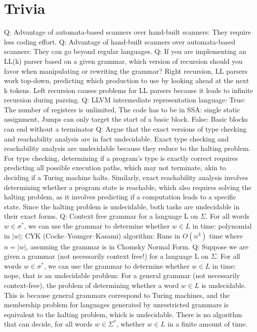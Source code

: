 
\section{Trivia}
Q: Advantage of automata-based scanners over hand-built scanners: They require less coding effort.
Q: Advantage of hand-built scanners over automata-based scanners: They can go beyond regular languages.
Q: If you are implementing an LL(k) parser based on a given grammar, which version of recursion should you favor when manipulating or rewriting the grammar? Right recursion, LL parsers work top-down, predicting which production to use by looking ahead at the next k tokens. Left recursion causes problems for LL parsers because it leads to infinite recursion during parsing.
Q: LLVM intermediate representation language: True: The number of registers is unlimited, The code has to be in SSA: single static assignment, Jumps can only target the start of a basic block. False: Basic blocks can end without a terminator
Q: Argue that the exact versions of type checking and reachability analysis are in fact undecidable. Exact type checking and reachability analysis are undecidable because they reduce to the halting problem. For type checking, determining if a program’s type is exactly correct requires predicting all possible execution paths, which may not terminate, akin to deciding if a Turing machine halts. Similarly, exact reachability analysis involves determining whether a program state is reachable, which also requires solving the halting problem, as it involves predicting if a computation leads to a specific state. Since the halting problem is undecidable, both tasks are undecidable in their exact forms.
Q: Context free grammar for a language L on $\Sigma$. For all words $w \in \sigma^*$, we can use the grammar to determine whether $w \in L$ in time: polynomial in $ \vert w \vert $: CYK (Cocke–Younger–Kasami) algorithm: Runs in $O(n^3)$ time where $n = \vert w \vert$, assuming the grammar is in Chomsky Normal Form.
Q: Suppose we are given a grammar (not necessarily context free!) for a language L on $\Sigma$. For all words $w \in \sigma^*$, we can use the grammar to determine whether $w \in L$ in time: nope, that is an undecidable problem: For a general grammar (not necessarily context-free), the problem of determining whether a word \( w \in L \) is undecidable. This is because general grammars correspond to Turing machines, and the membership problem for languages generated by unrestricted grammars is equivalent to the halting problem, which is undecidable. There is no algorithm that can decide, for all words \( w \in \Sigma^* \), whether \( w \in L \) in a finite amount of time.
